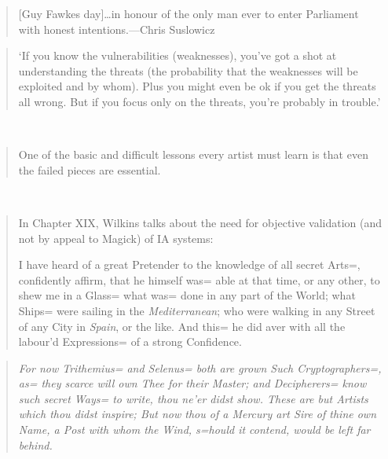 \documentclass[a4paper]{article}
\begin{document}
\medskip
\begin{quote}
	[Guy Fawkes day]\ldots in honour of the only man ever to
	enter Parliament with honest intentions.---Chris Suslowicz
\end{quote}

\medskip
\begin{quote}
	`If you know the vulnerabilities (weaknesses), you've got a
	shot at understanding the threats (the probability that the
	weaknesses will be exploited and by whom). Plus you might
	even be ok if you get the threats all wrong. But if you
	focus only on the threats, you're probably in trouble.'
\end{quote}~\cite{Johnston2008}

\medskip
\begin{quote}
	One of the basic and difficult lessons every artist must learn
	is that even the failed pieces are essential.
\end{quote}~\cite[pp.~5--6]{Bayles1993}

\medskip
\begin{quote}
	In Chapter XIX, Wilkins talks about the need for objective
	validation (and not by appeal
	to {\selectfont Magick}) of IA systems:

	{\selectfont I have heard of a great
	Pretender to the knowledge of all secret Arts=, confidently
	affirm, that he himself was= able at that time, or any other,
	to shew me in a Glass= what was= done in any part of the World;
	what Ships= were sailing in the \emph{Mediterranean}; who were
	walking in any Street of any City in \emph{Spain}, or the like.
	And this= he did aver with all the labour'd Expressions= of a
	strong Confidence.}~\cite[p.~81]{Wilkins1641}
\end{quote}

\medskip
\begin{quote}
	{\selectfont \emph{For now \emph{Trithemius=}
	and \emph{Selenus=} both are grown Such {\large Cryptographers=},
	as= they scarce will own Thee for their Master; and Decipherers=
	know such secret Ways= to write, thou ne'er didst show.  These
	are but {\selectfont Artists} which thou didst
	inspire; But now thou of a
	{\large Mercury} art Sire of thine own Name, a Post with whom
	the Wind, s=hould it contend, would be left far
	behind.}}~\cite[\emph{v}.]{Wilkins1641}
\end{quote}
\end{document}
